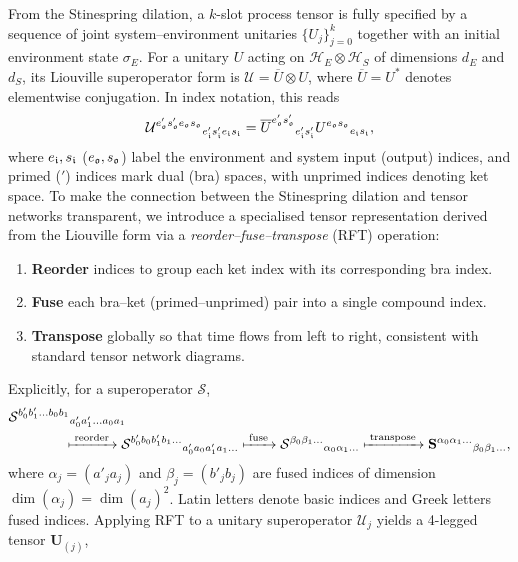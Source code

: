From the Stinespring dilation, a \(k\)-slot process tensor is fully specified by a sequence of joint system--environment unitaries \(\{U_j\}_{j=0}^k\) together with an initial environment state \(\sigma_E\). For a unitary \(U\) acting on \(\mathcal{H}_E \otimes \mathcal{H}_S\) of dimensions \(d_E\) and \(d_S\), its Liouville superoperator form is \(\mathcal{U} = \overline{U} \otimes U\), where \(\overline{U} = U^*\) denotes elementwise conjugation. In index notation, this reads
\begin{equation*}
    \mathcal{U}^{e'_{\mathfrak{o}} s'_{\mathfrak{o}} e_{\mathfrak{o}} s_{\mathfrak{o}}}{}_{e'_{\mathfrak{i}} s'_{\mathfrak{i}} e_{\mathfrak{i}} s_{\mathfrak{i}}} = \overline{U}^{e'_{\mathfrak{o}} s'_{\mathfrak{o}}}{}_{e'_{\mathfrak{i}} s'_{\mathfrak{i}}} U^{e_{\mathfrak{o}} s_{\mathfrak{o}}}{}_{e_{\mathfrak{i}} s_{\mathfrak{i}}},
\end{equation*}
where \(e_{\mathfrak{i}}, s_{\mathfrak{i}}\) (\(e_{\mathfrak{o}}, s_{\mathfrak{o}}\)) label the environment and system input (output) indices, and primed (\('\)) indices mark dual (bra) spaces, with unprimed indices denoting ket space. To make the connection between the Stinespring dilation and tensor networks transparent, we introduce a specialised tensor representation derived from the Liouville form via a \emph{reorder--fuse--transpose} (RFT) operation:
\begin{enumerate}
    \item \textbf{Reorder} indices to group each ket index with its corresponding bra index.
    \item \textbf{Fuse} each bra--ket (primed--unprimed) pair into a single compound index.
    \item \textbf{Transpose} globally so that time flows from left to right, consistent with standard tensor network diagrams.
\end{enumerate}
Explicitly, for a superoperator \(\mathcal{S}\),
\begin{equation*}
    \begin{split}
    &\mathcal{S}^{b'_0 b'_1 \dots b_0 b_1}{}_{a'_0 a'_1 \dots a_0 a_1} \\
    &\qquad\qquad\xmapsto{\;\text{reorder}\;}
    \mathcal{S}^{b'_0 b_0 b'_1 b_1 \dots}{}_{a'_0 a_0 a'_1 a_1 \dots}
    \xmapsto{\;\text{fuse}\;}
    \mathcal{S}^{\beta_0 \beta_1 \dots}{}_{\alpha_0 \alpha_1 \dots}
    \xmapsto{\;\text{transpose}\;}
    \mathbf{S}^{\alpha_0 \alpha_1 \dots}{}_{\beta_0 \beta_1 \dots},
    \end{split}
\end{equation*}
where \(\alpha_j = (a'_j a_j)\) and \(\beta_j = (b'_j b_j)\) are fused indices of dimension \(\dim(\alpha_j) = \dim(a_j)^2\). Latin letters denote basic indices and Greek letters fused indices. Applying RFT to a unitary superoperator \(\mathcal{U}_j\) yields a 4-legged tensor \(\mathbf{U}_{(j)}\),
